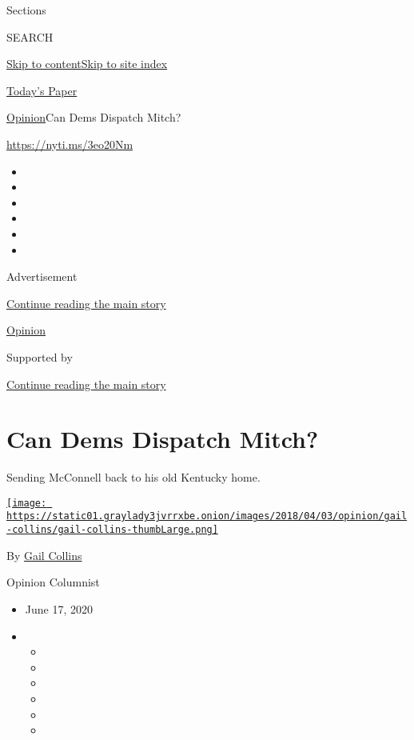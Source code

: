 Sections

SEARCH

\protect\hyperlink{site-content}{Skip to
content}\protect\hyperlink{site-index}{Skip to site index}

\href{https://myaccount.nytimes3xbfgragh.onion/auth/login?response_type=cookie\&client_id=vi}{}

\href{https://www.nytimes3xbfgragh.onion/section/todayspaper}{Today's
Paper}

\href{/section/opinion}{Opinion}\textbar{}Can Dems Dispatch Mitch?

\url{https://nyti.ms/3eo20Nm}

\begin{itemize}
\item
\item
\item
\item
\item
\item
\end{itemize}

Advertisement

\protect\hyperlink{after-top}{Continue reading the main story}

\href{/section/opinion}{Opinion}

Supported by

\protect\hyperlink{after-sponsor}{Continue reading the main story}

\hypertarget{can-dems-dispatch-mitch}{%
\section{Can Dems Dispatch Mitch?}\label{can-dems-dispatch-mitch}}

Sending McConnell back to his old Kentucky home.

\href{https://www.nytimes3xbfgragh.onion/by/gail-collins}{\texttt{[image: https://static01.graylady3jvrrxbe.onion/images/2018/04/03/opinion/gail-collins/gail-collins-thumbLarge.png]}}

By \href{https://www.nytimes3xbfgragh.onion/by/gail-collins}{Gail
Collins}

Opinion Columnist

\begin{itemize}
\item
  June 17, 2020
\item
  \begin{itemize}
  \item
  \item
  \item
  \item
  \item
  \item
  \end{itemize}
\end{itemize}

